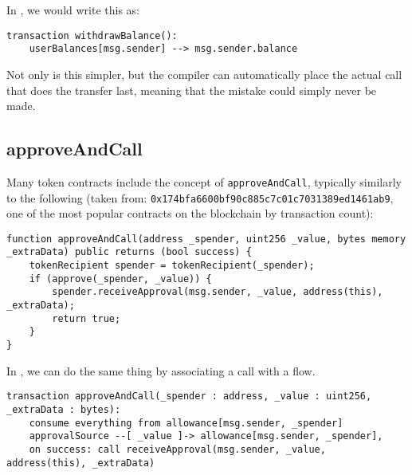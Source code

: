 \documentclass[10pt]{article}
\begin{document}
In \langName, we would write this as:

\begin{lstlisting}
transaction withdrawBalance():
    userBalances[msg.sender] --> msg.sender.balance
\end{lstlisting}

Not only is this simpler, but the compiler can automatically place the actual call that does the transfer last, meaning that the mistake could simply never be made.

\subsection{approveAndCall}

Many token contracts include the concept of \lstinline{approveAndCall}, typically similarly to the following (taken from: \lstinline{0x174bfa6600bf90c885c7c01c7031389ed1461ab9}, one of the most popular contracts on the blockchain by transaction count):
\begin{lstlisting}
function approveAndCall(address _spender, uint256 _value, bytes memory _extraData) public returns (bool success) {
    tokenRecipient spender = tokenRecipient(_spender);
    if (approve(_spender, _value)) {
        spender.receiveApproval(msg.sender, _value, address(this), _extraData);
        return true;
    }
}
\end{lstlisting}

In \langName, we can do the same thing by associating a call with a flow.
\begin{lstlisting}
transaction approveAndCall(_spender : address, _value : uint256, _extraData : bytes):
    consume everything from allowance[msg.sender, _spender]
    approvalSource --[ _value ]-> allowance[msg.sender, _spender],
    on success: call receiveApproval(msg.sender, _value, address(this), _extraData)
\end{lstlisting}
\end{document}
